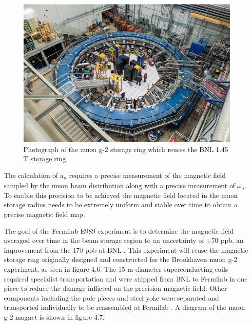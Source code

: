 \begin{figure}[th]
\centering
\includegraphics{Figures/storagering}
\decoRule
\caption{Photograph of the muon g-2 storage ring which reuses the BNL 1.45 T storage ring.}
\label{fig:storagering}
\end{figure}

The calculation of a$_{\mu}$ requires a precise measurement of the magnetic field sampled by the muon beam distribution along with a precise measurement of $\omega{_a}$. 
To enable this precision to be achieved the magnetic field located in the muon storage radius needs to be extremely uniform and stable over time to obtain a precise magnetic field map.
 
The goal of the Fermilab E989 experiment is to determine the magnetic field averaged over time in the beam storage region to an uncertainty of $\pm$70 ppb, an improvement from the 170 ppb at BNL \cite{Reference22}. This experiment will reuse the magnetic storage ring originally designed and constructed for the Brookhaven muon g-2 experiment, as seen in figure 4.6. The 15 m diameter superconducting coils required specialist transportation and were shipped from BNL to Fermilab in one piece to reduce the damage inflicted on the precision magnetic field. Other components including the pole pieces and steel yoke were separated and transported individually to be reassembled at Fermilab \cite{magref2}. A diagram of the muon g-2 magnet is shown in figure 4.7.

